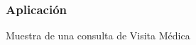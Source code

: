 \documentclass[14pt]{beamer}
\begin{document}
\begin{frame}
\frametitle{Aplicación}
Muestra de una consulta de Visita Médica
\begin{columns}
\begin{column}{0.3\textwidth}
\begin{center}


\end{center}
\end{column}


\end{columns}

\end{frame}
\end{document}
